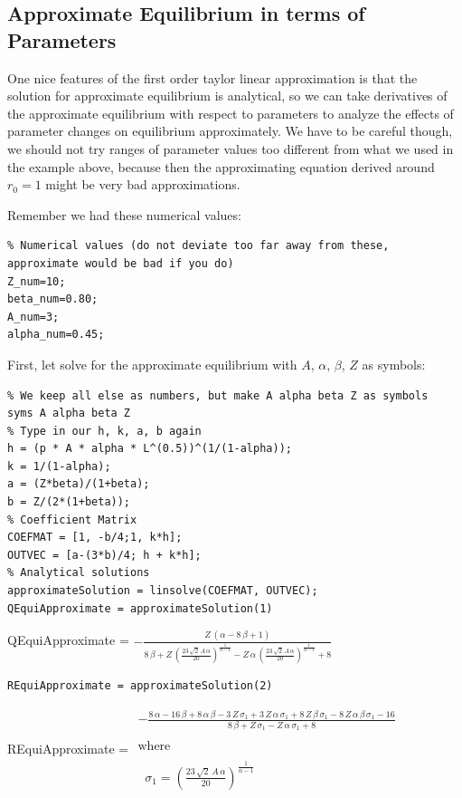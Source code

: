 \documentclass[
]{book}
\begin{document}
\hypertarget{approximate-equilibrium-in-terms-of-parameters}{%
\subsection{Approximate Equilibrium in terms of Parameters}\label{approximate-equilibrium-in-terms-of-parameters}}

One nice features of the first order taylor linear approximation is that
the solution for approximate equilibrium is analytical, so we can take
derivatives of the approximate equilibrium with respect to parameters to
analyze the effects of parameter changes on equilibrium approximately.
We have to be careful though, we should not try ranges of parameter
values too different from what we used in the example above, because
then the approximating equation derived around \(r_0 =1\) might be very
bad approximations.

Remember we had these numerical values:

\begin{verbatim}
% Numerical values (do not deviate too far away from these, approximate would be bad if you do)
Z_num=10;
beta_num=0.80;
A_num=3; 
alpha_num=0.45;
\end{verbatim}

First, let solve for the approximate equilibrium with \(A\), \(\alpha\),
\(\beta\), \(Z\) as symbols:

\begin{verbatim}
% We keep all else as numbers, but make A alpha beta Z as symbols
syms A alpha beta Z
% Type in our h, k, a, b again
h = (p * A * alpha * L^(0.5))^(1/(1-alpha));
k = 1/(1-alpha);
a = (Z*beta)/(1+beta);
b = Z/(2*(1+beta));
% Coefficient Matrix
COEFMAT = [1, -b/4;1, k*h];
OUTVEC = [a-(3*b)/4; h + k*h];
% Analytical solutions
approximateSolution = linsolve(COEFMAT, OUTVEC);
QEquiApproximate = approximateSolution(1)
\end{verbatim}

QEquiApproximate =
\(\displaystyle -\frac{Z\,{\left(\alpha -8\,\beta +1\right)}}{8\,\beta +Z\,{{\left(\frac{23\,\sqrt{2}\,A\,\alpha }{20}\right)}}^{\frac{1}{\alpha -1}} -Z\,\alpha \,{{\left(\frac{23\,\sqrt{2}\,A\,\alpha }{20}\right)}}^{\frac{1}{\alpha -1}} +8}\)

\begin{verbatim}
REquiApproximate = approximateSolution(2)
\end{verbatim}

REquiApproximate = \(\displaystyle \begin{array}{l} -\frac{8\,\alpha -16\,\beta +8\,\alpha \,\beta -3\,Z\,\sigma_1 +3\,Z\,\alpha \,\sigma_1 +8\,Z\,\beta \,\sigma_1 -8\,Z\,\alpha \,\beta \,\sigma_1 -16}{8\,\beta +Z\,\sigma_1 -Z\,\alpha \,\sigma_1 +8}\\ \mathrm{}\\ \textrm{where}\\ \mathrm{}\\ \;\;\sigma_1 ={{\left(\frac{23\,\sqrt{2}\,A\,\alpha }{20}\right)}}^{\frac{1}{\alpha -1}} \end{array}\)
\end{document}
